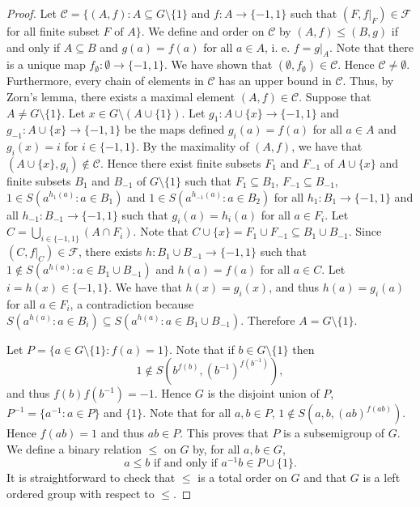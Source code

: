 \begin{proof}
	Let $\mathcal{C}=\{ (A,f) : A\subseteq G\setminus\{ 1\}$ and $f\colon A\to \{ -1,1\}$ such that  $(F,f|_F)\in\mathcal{F}$ for all finite subset $F\text{ of }A \}$. We define and order on $\mathcal{C}$ by $(A,f)\leq (B,g)$ if and only if $A\subseteq B$ and $g(a)=f(a)$ for all $a\in A$, i. e. $f=g|_A$. Note that there is a unique map $f_{\emptyset}\colon \emptyset\to \{-1,1\}$. We have shown that $(\emptyset,f_{\emptyset})\in\mathcal{C}$. Hence $\mathcal{C}\neq \emptyset$. Furthermore, every chain of elements in $\mathcal{C}$ has an upper bound in $\mathcal{C}$. Thus, by Zorn's lemma, there exists a maximal element $(A,f)\in\mathcal{C}$. Suppose that $A\neq G\setminus\{ 1\}$. Let $x\in G\setminus (A\cup\{ 1\})$. Let $g_1\colon A\cup\{ x\}\to\{ -1,1\}$ and $g_{-1}\colon A\cup\{ x\}\to\{ -1,1\}$ be the maps defined $g_i(a)=f(a)$ for all $a\in A$ and $g_i(x)=i$ for $i\in\{ -1,1\}$. By the maximality of $(A,f)$, we have that $(A\cup\{ x\}, g_i)\not\in\mathcal{C}$. Hence there exist finite subsets $F_1$ and $F_{-1}$ of $A\cup \{ x\}$ and finite subsets $B_1$ and $B_{-1}$ of $G\setminus\{ 1\}$ such that $F_1\subseteq B_1$, $F_{-1}\subseteq B_{-1}$, $1\in S(a^{h_1(a)}: a\in B_1)$ and $1\in S(a^{h_{-1}(a)}:a\in B_2)$ for all $h_1\colon B_1\to\{ -1,1\}$ and all $h_{-1}\colon B_{-1}\to \{ -1,1\}$ such that $g_i(a)=h_i(a)$ for all $a\in F_i$. Let $C=\bigcup_{i\in\{ -1,1\}}(A\cap F_i)$. Note that $C\cup\{ x\}=F_1\cup F_{-1}\subseteq B_1\cup B_{-1}$. Since $(C,f|_{C})\in \mathcal{F}$, there exists $h\colon B_1\cup B_{-1}\to\{ -1,1\}$ such that $1\notin S(a^{h(a)}: a\in B_1\cup B_{-1})$ and $h(a)=f(a)$ for all $a\in C$. Let $i=h(x)\in\{ -1,1\}$. We have that $h(x)=g_i(x)$, and thus $h(a)=g_i(a)$ for all $a\in F_i$, a contradiction because $S(a^{h(a)}:a\in B_i)\subseteq S(a^{h(a)}: a\in B_1\cup B_{-1})$.
	Therefore $A=G\setminus\{ 1\}$. 
	
	Let $P=\{a\in G\setminus \{1\} : f(a)=1\}$. Note that if $b\in G\setminus\{ 1\}$ then 
	\[1\notin S(b^{f(b)},(b^{-1})^{f(b^{-1})}),\] 
	and thus $f(b)f(b^{-1})=-1$. Hence $G$ is the disjoint union of $P$, $P^{-1}=\{ a^{-1} : a\in P\}$ and $\{ 1\}$. Note that for all $a,b\in P$, $1\notin S(a,b,(ab)^{f(ab)})$. Hence $f(ab)=1$ and thus $ab\in P$. This proves that $P$ is a subsemigroup of $G$. We define a binary relation $\leq$ on $G$ by, for all $a,b\in G$,
	\[ a\leq b\text{ if and only if }a^{-1}b\in P\cup\{ 1\}.\]
	It is straightforward to check that $\leq$ is a total order on $G$ and that $G$ is a left ordered group with respect to $\leq$.
\end{proof}


